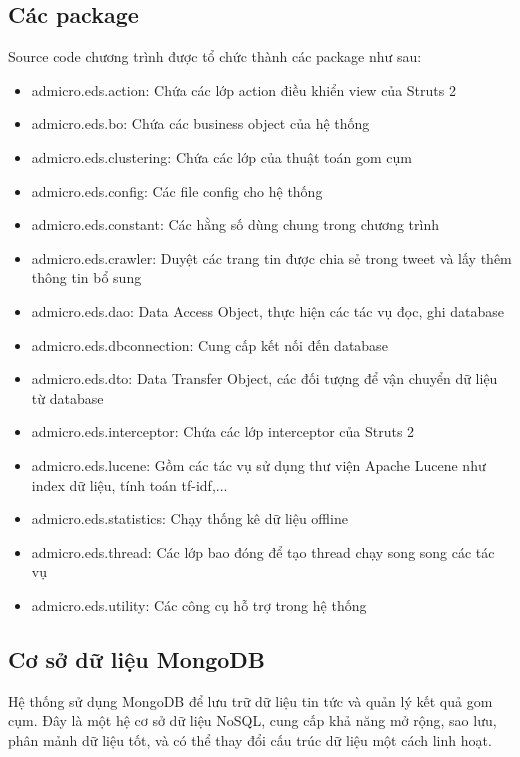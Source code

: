 	\subsection{Các package}
	Source code chương trình được tổ chức thành các package như sau:
	\begin{itemize}
		\item admicro.eds.action: Chứa các lớp action điều khiển view của Struts 2
		\item admicro.eds.bo: Chứa các business object của hệ thống
		\item admicro.eds.clustering: Chứa các lớp của thuật toán gom cụm
		\item admicro.eds.config: Các file config cho hệ thống
		\item admicro.eds.constant: Các hằng số dùng chung trong chương trình
		\item admicro.eds.crawler: Duyệt các trang tin được chia sẻ trong tweet và lấy thêm thông tin bổ sung
		\item admicro.eds.dao: Data Access Object, thực hiện các tác vụ đọc, ghi database
		\item admicro.eds.dbconnection: Cung cấp kết nối đến database
		\item admicro.eds.dto: Data Transfer Object, các đối tượng để vận chuyển dữ liệu từ database
		\item admicro.eds.interceptor: Chứa các lớp interceptor của Struts 2
		\item admicro.eds.lucene: Gồm các tác vụ sử dụng thư viện Apache Lucene như index dữ liệu, tính toán tf-idf,...
		\item admicro.eds.statistics: Chạy thống kê dữ liệu offline
		\item admicro.eds.thread: Các lớp bao đóng để tạo thread chạy song song các tác vụ
		\item admicro.eds.utility: Các công cụ hỗ trợ trong hệ thống
	\end{itemize}
	
	\subsection{Cơ sở dữ liệu MongoDB}
	Hệ thống sử dụng MongoDB để lưu trữ dữ liệu tin tức và quản lý kết quả gom cụm. Đây là một hệ cơ sở dữ liệu NoSQL, cung cấp khả năng mở rộng, sao lưu, phân mảnh dữ liệu tốt, và có thể thay đổi cấu trúc dữ liệu một cách linh hoạt.
	
